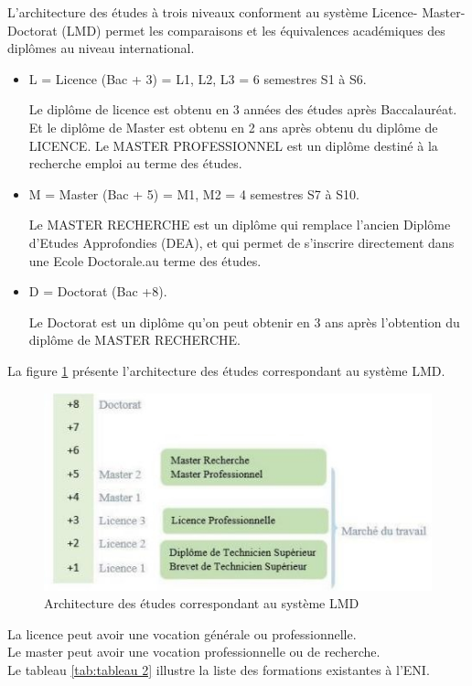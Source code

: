 \documentclass[12pt]{report}
\begin{document}
				L’architecture des études à trois niveaux conforment au système Licence- Master-Doctorat (LMD) permet les comparaisons et les équivalences académiques des diplômes au niveau international. 

				\begin{itemize}
					\item L = Licence (Bac + 3) = L1, L2, L3 = 6 semestres S1 à S6.

						Le diplôme de licence est obtenu en 3 années des études après Baccalauréat. Et le diplôme de Master est obtenu en 2 ans après obtenu du diplôme de LICENCE. Le MASTER PROFESSIONNEL est un diplôme destiné à la recherche emploi au terme des études.

					\item M = Master (Bac + 5) = M1, M2 = 4 semestres S7 à S10.

						Le MASTER RECHERCHE est un diplôme qui remplace l’ancien Diplôme d’Etudes Approfondies (DEA), et qui permet de s’inscrire directement dans une Ecole Doctorale.au terme des études.

					\item D = Doctorat (Bac +8).

						Le Doctorat est un diplôme qu’on peut obtenir en 3 ans après l’obtention du diplôme de MASTER RECHERCHE.\\
				\end{itemize}
				La figure \ref{fig:figure 2} présente l’architecture des études correspondant au système LMD.
				\begin{figure}[h]
					\centering
					\includegraphics[width=\textwidth]{image5.png}
					\caption{Architecture des études correspondant au système LMD}
					\label{fig:figure 2}
				\end{figure}
				\clearpage
				\noindent La licence peut avoir une vocation générale ou professionnelle.\\
				Le master peut avoir une vocation professionnelle ou de recherche.\\
				Le tableau \ref{tab:tableau 2} illustre la liste des formations existantes à l’ENI.
\end{document}
